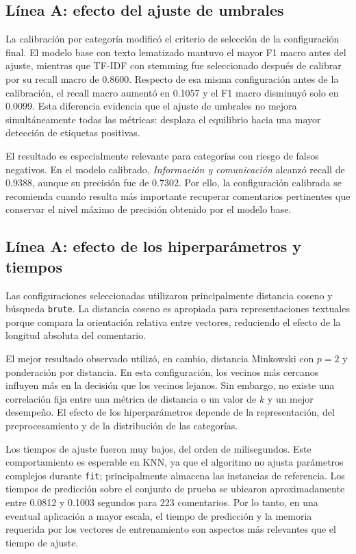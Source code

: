 \documentclass[12pt,a4paper]{article}
\newcommand{\code}[1]{\nolinkurl{#1}}
\begin{document}
\subsection{Línea A: efecto del ajuste de umbrales}

La calibración por categoría modificó el criterio de selección de la configuración final. El modelo base con texto lematizado mantuvo el mayor F1 macro antes del ajuste, mientras que TF-IDF con stemming fue seleccionado después de calibrar por su recall macro de 0.8600. Respecto de esa misma configuración antes de la calibración, el recall macro aumentó en 0.1057 y el F1 macro disminuyó solo en 0.0099. Esta diferencia evidencia que el ajuste de umbrales no mejora simultáneamente todas las métricas: desplaza el equilibrio hacia una mayor detección de etiquetas positivas.

El resultado es especialmente relevante para categorías con riesgo de falsos negativos. En el modelo calibrado, \textit{Información y comunicación} alcanzó recall de 0.9388, aunque su precisión fue de 0.7302. Por ello, la configuración calibrada se recomienda cuando resulta más importante recuperar comentarios pertinentes que conservar el nivel máximo de precisión obtenido por el modelo base.

\subsection{Línea A: efecto de los hiperparámetros y tiempos}

Las configuraciones seleccionadas utilizaron principalmente distancia coseno y búsqueda \code{brute}. La distancia coseno es apropiada para representaciones textuales porque compara la orientación relativa entre vectores, reduciendo el efecto de la longitud absoluta del comentario.

El mejor resultado observado utilizó, en cambio, distancia Minkowski con $p=2$ y ponderación por distancia. En esta configuración, los vecinos más cercanos influyen más en la decisión que los vecinos lejanos. Sin embargo, no existe una correlación fija entre una métrica de distancia o un valor de $k$ y un mejor desempeño. El efecto de los hiperparámetros depende de la representación, del preprocesamiento y de la distribución de las categorías.

Los tiempos de ajuste fueron muy bajos, del orden de milisegundos. Este comportamiento es esperable en KNN, ya que el algoritmo no ajusta parámetros complejos durante \code{fit}; principalmente almacena las instancias de referencia. Los tiempos de predicción sobre el conjunto de prueba se ubicaron aproximadamente entre 0.0812 y 0.1003 segundos para 223 comentarios. Por lo tanto, en una eventual aplicación a mayor escala, el tiempo de predicción y la memoria requerida por los vectores de entrenamiento son aspectos más relevantes que el tiempo de ajuste.
\end{document}
